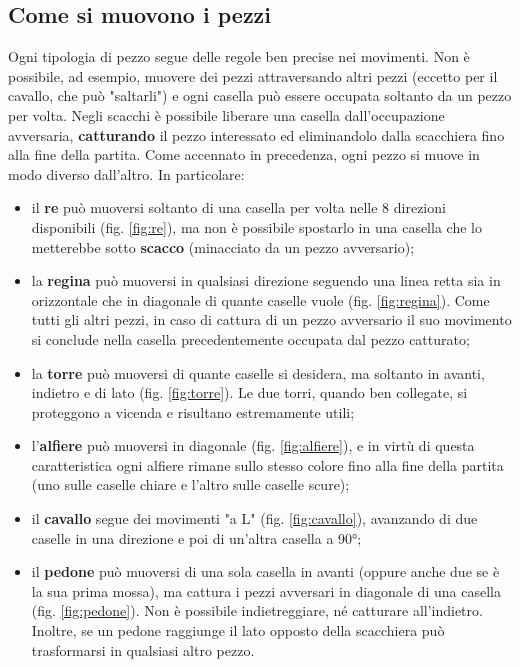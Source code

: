 \subsection{Come si muovono i pezzi}
Ogni tipologia di pezzo segue delle regole ben precise nei movimenti. Non è possibile, ad esempio, muovere dei pezzi attraversando altri pezzi (eccetto per il cavallo, che può "saltarli") e ogni casella può essere occupata soltanto da un pezzo per volta. Negli scacchi è possibile liberare una casella dall'occupazione avversaria, \textbf{catturando} il pezzo interessato ed eliminandolo dalla scacchiera fino alla fine della partita. Come accennato in precedenza, ogni pezzo si muove in modo diverso dall'altro. In particolare:
\begin{itemize}
    \item il \textbf{re} può muoversi soltanto di una casella per volta nelle 8 direzioni disponibili (fig. \ref{fig:re}), ma non è possibile spostarlo in una casella che lo metterebbe sotto \textbf{scacco} (minacciato da un pezzo avversario);
    \item la \textbf{regina} può muoversi in qualsiasi direzione seguendo una linea retta sia in orizzontale che in diagonale di quante caselle vuole (fig. \ref{fig:regina}). Come tutti gli altri pezzi, in caso di cattura di un pezzo avversario il suo movimento si conclude nella casella precedentemente occupata dal pezzo catturato;
    \item la \textbf{torre} può muoversi di quante caselle si desidera, ma soltanto in avanti, indietro e di lato (fig. \ref{fig:torre}). Le due torri, quando ben collegate, si proteggono a vicenda e risultano estremamente utili;
    \item l'\textbf{alfiere} può muoversi in diagonale (fig. \ref{fig:alfiere}), e in virtù di questa caratteristica ogni alfiere rimane sullo stesso colore fino alla fine della partita (uno sulle caselle chiare e l'altro sulle caselle scure);
    \item il \textbf{cavallo} segue dei movimenti "a L" (fig. \ref{fig:cavallo}), avanzando di due caselle in una direzione e poi di un'altra casella a 90°;
    \item il \textbf{pedone} può muoversi di una sola casella in avanti (oppure anche due se è la sua prima mossa), ma cattura i pezzi avversari in diagonale di una casella (fig. \ref{fig:pedone}). Non è possibile indietreggiare, né catturare all'indietro. Inoltre, se un pedone raggiunge il lato opposto della scacchiera può trasformarsi in qualsiasi altro pezzo.
\end{itemize}
\newpage



